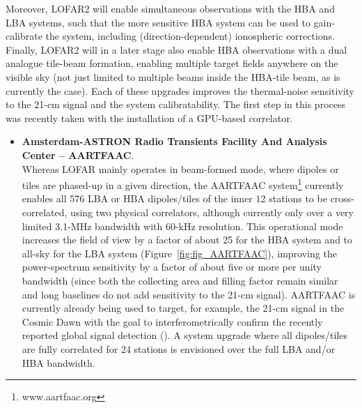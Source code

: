 
Moreover, LOFAR2 will enable simultaneous observations with the HBA and LBA systems, such that the more sensitive HBA system can be used to gain-calibrate the system, including (direction-dependent) ionospheric corrections. Finally, LOFAR2 will in a later stage also enable HBA observations with a dual analogue tile-beam formation, enabling multiple target fields anywhere on the visible sky (not just limited to multiple beams inside the HBA-tile beam, as is currently the case). Each of these upgrades improves the thermal-noise sensitivity to the 21-cm signal and the system calibratability. The first step in this process 
was recently taken with the installation of a GPU-based correlator.  


\begin{itemize}
%
\item {\bf Amsterdam-ASTRON Radio Transients Facility And Analysis Center -- AARTFAAC}.\\
Whereas LOFAR mainly operates in beam-formed mode, where dipoles or tiles are phased-up in a given direction, the AARTFAAC system\footnote{www.aartfaac.org} currently enables all 576 LBA or HBA dipoles/tiles of the inner 12 stations to be cross-correlated, using two physical correlators, although currently only over a very limited 3.1-MHz bandwidth with 60-kHz resolution. This operational mode increases the field of view by a factor of about 25 for the HBA system and to all-sky for the LBA system (Figure~\ref{fig:fig_AARTFAAC}), improving the power-spectrum sensitivity by a factor of about five or more per unity bandwidth (since both the collecting area and filling factor remain similar and long baselines do not add sensitivity to the 21-cm signal). AARTFAAC is currently already being used to target, for example, the 21-cm signal in the Cosmic Dawn with the goal to interferometrically confirm the recently reported global signal detection (\cite{bowman18}). A system upgrade where all dipoles/tiles are fully correlated for 24 stations is envisioned over the full LBA and/or HBA bandwidth. 
\end{itemize}



